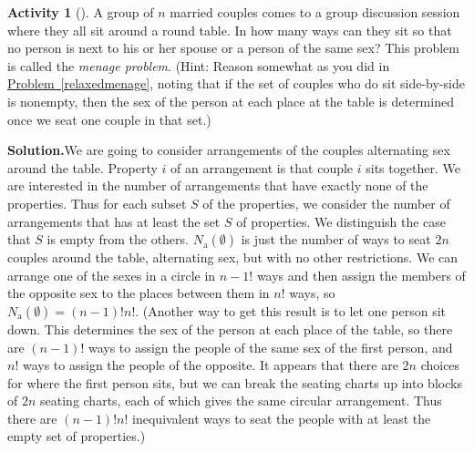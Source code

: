 \documentclass[10pt,]{book}
\theoremstyle{plain}
\theoremstyle{definition}
\newtheorem{activity}[project]{Activity}
\numberwithin{equation}{chapter}
\begin{document}
\begin{activity}[]\label{activity-218}
A group of \(n\) married couples comes to a group discussion session where they all sit around a round table. In how many ways can they sit so that no person is next to his or her spouse or a person of the same sex? This problem is called the \emph{menage problem}. (Hint: Reason somewhat as you did in \hyperref[relaxedmenage]{Problem~\ref{relaxedmenage}}, noting that if the set of couples who do sit side-by-side is nonempty, then the sex of the person at each place at the table is determined once we seat one couple in that set.)%
\par\medskip\noindent%
\textbf{Solution.}\quad We are going to consider arrangements of the couples alternating sex around the table. Property \(i\) of an arrangement is that couple \(i\) sits together. We are interested in the number of arrangements that have exactly none of the properties. Thus for each subset \(S\) of the properties, we consider the number of arrangements that has at least the set \(S\) of properties. We distinguish the case that \(S\) is empty from the others. \(N_{\mbox{a} }(\emptyset)\) is just the number of ways to seat \(2n\) couples around the table, alternating sex, but with no other restrictions. We can arrange one of the sexes in a circle in \(n-1!\) ways and then assign the members of the opposite sex to the places between them in \(n!\) ways, so \(N_{\mbox{a} }(\emptyset) = (n-1)!n!\). (Another way to get this result is to let one person sit down. This determines the sex of the person at each place of the table, so there are \((n-1)!\) ways to assign the people of the same sex of the first person, and \(n!\) ways to assign the people of the opposite. It appears that there are \(2n\) choices for where the first person sits, but we can break the seating charts up into blocks of \(2n\) seating charts, each of which gives the same circular arrangement. Thus there are \((n-1)!n!\) inequivalent ways to seat the people with at least the empty set of properties.)%
\par

\end{activity}
\end{document}
